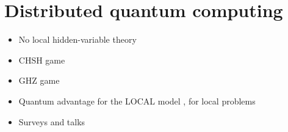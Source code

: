 \documentclass[a4paper,11pt]{article}
\begin{document}
\section{Distributed quantum computing}
\begin{itemize}
    \item No local hidden-variable theory \cite{bell-1964-on-the-einstein-podolsky-rosen-paradox}
    \item CHSH game \cite{clauser-horne-etal-1969-proposed-experiment-to-test}
    \item GHZ game \cite{greenberger-horne-zeilinger-1989-going-beyond-bell-s}
    \item Quantum advantage for the LOCAL model \cite{le-gall-nishimura-rosmanis-2019-quantum-advantage-for}, for local problems \cite{balliu-brandt-etal-2025-distributed-quantum-advantage,balliu-casagrande-etal-2026-distributed-quantum}
    \item Surveys and talks \cite{le-gall-2022-quantum-distributed-computing,d-amore-2025-on-the-limits-of-distributed-quantum}
\end{itemize}


\end{document}

